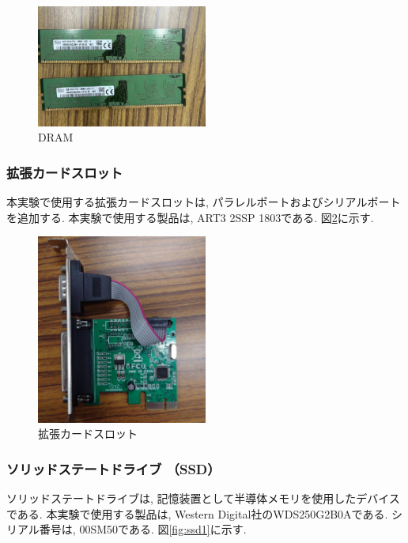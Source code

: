 \documentclass{ltjsarticle} %
\begin{document}
\begin{figure}[H] %
  \centering
  \includegraphics[width=0.5\textwidth]{dram2.jpg} %
  \caption{DRAM} %
  \label{fig:dram2} %
\end{figure}


\subsubsection{拡張カードスロット}
本実験で使用する拡張カードスロットは, パラレルポートおよびシリアルポートを追加する. 
本実験で使用する製品は, ART3 2SSP 1803である. 図\ref{fig:port}に示す.

\begin{figure}[H] %
  \centering
  \includegraphics[width=0.5\textwidth]{port.jpg} %
  \caption{拡張カードスロット} %
  \label{fig:port} %
\end{figure}


\subsubsection{ソリッドステートドライブ （SSD）}
ソリッドステートドライブは, 記憶装置として半導体メモリを使⽤したデバイスである.
本実験で使用する製品は, Western Digital社のWDS250G2B0Aである. シリアル番号は, 00SM50である. 図\ref{fig:ssd1}に示す.
\end{document}
